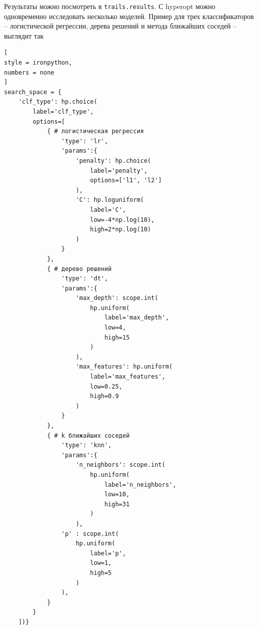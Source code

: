\documentclass[%
	11pt,
	a4paper,
	utf8,
		]{article}
\begin{document}
Результаты можно посмотреть в \texttt{trails.results}. С hyperopt можно одновременно исследовать несколько моделей. Пример для трех классификаторов -- логистической регрессии, дерева решений и метода ближайших соседей -- выглядит так
\begin{lstlisting}[
style = ironpython,
numbers = none	
]
search_space = {
	'clf_type': hp.choice(
		label='clf_type', 
		options=[
			{ # логистическая регрессия
				'type': 'lr', 
				'params':{
					'penalty': hp.choice(
						label='penalty', 
						options=['l1', 'l2']
					),
					'C': hp.loguniform(
						label='C', 
						low=-4*np.log(10), 
						high=2*np.log(10)
					)
				}
			}, 
			{ # дерево решений
				'type': 'dt', 
				'params':{
					'max_depth': scope.int(
						hp.uniform(
							label='max_depth', 
							low=4,
							high=15
						)
					),    
					'max_features': hp.uniform(
						label='max_features', 
						low=0.25,
						high=0.9
					)
				}
			},
			{ # k ближайших соседей
				'type': 'knn', 
				'params':{
					'n_neighbors': scope.int(
						hp.uniform(
							label='n_neighbors', 
							low=10,
							high=31
						)
					),
				'p' : scope.int(
					hp.uniform(
						label='p', 
						low=1,
						high=5
					)
				),
			}
		}  
	])}
\end{lstlisting}
\end{document}
